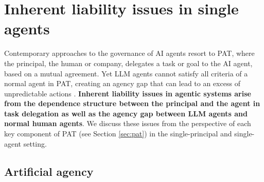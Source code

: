 \documentclass[11pt]{article}
\begin{document}

\section{Inherent liability issues in single agents}

Contemporary approaches to the governance of AI agents \citep{kampik_governance_2022,chan_harms_2023,chan_visibility_2024,kolt_governing_2025} resort to PAT, where the principal, the human or company, delegates a task or goal to the AI agent, based on a mutual agreement. Yet LLM agents cannot satisfy all criteria of a normal agent \citep{perrier_position_2025} in PAT, creating an agency gap that can lead to an excess of unpredictable actions \citep{john_owasp_2025}. \textbf{Inherent liability issues in agentic systems arise from the dependence structure between the principal and the agent in task delegation as well as the agency gap between LLM agents and normal human agents}. We discuss these issues from the perspective of each key component of PAT (see Section \ref{sec:pat}) in the single-principal and single-agent setting.


\subsection{Artificial agency}
\label{sec:aiagency}
\end{document}
